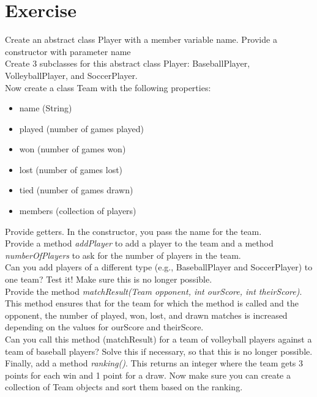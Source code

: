 \section{Exercise}

\begin{oefening}
Create an abstract class Player with a member variable name. Provide a constructor with  parameter name
\\
Create 3 subclasses for this abstract class Player: BaseballPlayer, VolleyballPlayer, and SoccerPlayer.
\\
Now create a class Team with the following properties:
\\
\begin{itemize}
\item name (String)
\item played (number of games played)
\item won (number of games won)
\item lost (number of games lost)
\item tied (number of games drawn)
\item members (collection of players)
\end{itemize}

Provide getters.  In the constructor,  you pass the name for the team.
\\

Provide a method \textit{addPlayer} to add a player to the team and a method \textit{numberOfPlayers} to ask for the number of players in the team.
\\
Can you add players of a different type (e.g., BaseballPlayer and SoccerPlayer) to one team? Test it! Make sure this is no longer possible.
\\
Provide the method \textit{matchResult(Team opponent, int ourScore, int theirScore)}. This method ensures that for the team for which the method is called and the opponent, the number of played, won, lost, and drawn matches is increased depending on the values for ourScore and theirScore.
\\
Can you call this method (matchResult) for a team of volleyball players against a team of baseball players? Solve this if necessary, so that this is no longer possible.
\\
Finally, add a method \textit{ranking()}. This returns an integer where the team gets 3 points for each win and 1 point for a draw. Now make sure you can create a collection of Team objects and sort them based on the ranking.
\end{oefening}



